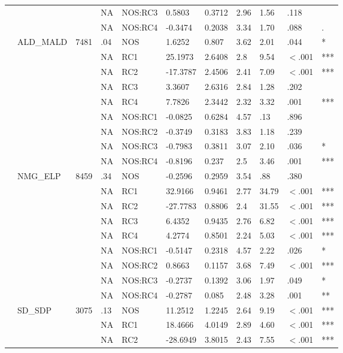\begin{table}[ht]
\begin{tabular}{lllllllllll}
   &  &  & NA & NOS:RC3 & 0.5803 & 0.3712 & 2.96 & 1.56 & .118 &   \\ 
   &  &  & NA & NOS:RC4 & -0.3474 & 0.2038 & 3.34 & 1.70 & .088 & . \\ 
   & ALD\_MALD & 7481 & .04 & NOS & 1.6252 & 0.807 & 3.62 & 2.01 & .044 & * \\ 
   &  &  & NA & RC1 & 25.1973 & 2.6408 & 2.8 & 9.54 & $<$.001 & *** \\ 
   &  &  & NA & RC2 & -17.3787 & 2.4506 & 2.41 & 7.09 & $<$.001 & *** \\ 
   &  &  & NA & RC3 & 3.3607 & 2.6316 & 2.84 & 1.28 & .202 &   \\ 
   &  &  & NA & RC4 & 7.7826 & 2.3442 & 2.32 & 3.32 & .001 & *** \\ 
   &  &  & NA & NOS:RC1 & -0.0825 & 0.6284 & 4.57 & .13 & .896 &   \\ 
   &  &  & NA & NOS:RC2 & -0.3749 & 0.3183 & 3.83 & 1.18 & .239 &   \\ 
   &  &  & NA & NOS:RC3 & -0.7983 & 0.3811 & 3.07 & 2.10 & .036 & * \\ 
   &  &  & NA & NOS:RC4 & -0.8196 & 0.237 & 2.5 & 3.46 & .001 & *** \\ 
   & NMG\_ELP & 8459 & .34 & NOS & -0.2596 & 0.2959 & 3.54 & .88 & .380 &   \\ 
   &  &  & NA & RC1 & 32.9166 & 0.9461 & 2.77 & 34.79 & $<$.001 & *** \\ 
   &  &  & NA & RC2 & -27.7783 & 0.8806 & 2.4 & 31.55 & $<$.001 & *** \\ 
   &  &  & NA & RC3 & 6.4352 & 0.9435 & 2.76 & 6.82 & $<$.001 & *** \\ 
   &  &  & NA & RC4 & 4.2774 & 0.8501 & 2.24 & 5.03 & $<$.001 & *** \\ 
   &  &  & NA & NOS:RC1 & -0.5147 & 0.2318 & 4.57 & 2.22 & .026 & * \\ 
   &  &  & NA & NOS:RC2 & 0.8663 & 0.1157 & 3.68 & 7.49 & $<$.001 & *** \\ 
   &  &  & NA & NOS:RC3 & -0.2737 & 0.1392 & 3.06 & 1.97 & .049 & * \\ 
   &  &  & NA & NOS:RC4 & -0.2787 & 0.085 & 2.48 & 3.28 & .001 & ** \\ 
   & SD\_SDP & 3075 & .13 & NOS & 11.2512 & 1.2245 & 2.64 & 9.19 & $<$.001 & *** \\ 
   &  &  & NA & RC1 & 18.4666 & 4.0149 & 2.89 & 4.60 & $<$.001 & *** \\ 
   &  &  & NA & RC2 & -28.6949 & 3.8015 & 2.43 & 7.55 & $<$.001 & *** \\ 

\end{tabular}
\end{table}
